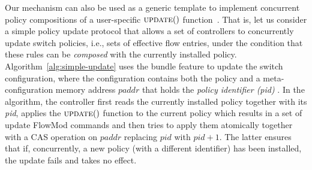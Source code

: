 \documentclass[conference]{sigcomm-alternate}
\newcommand{\paddr}{\textit{paddr}\xspace}
\newcommand{\pid}{\textit{pid}\xspace}
\newcommand{\ufunc}{update} %
\newcommand{\liron}[1]{\textit{\textcolor{mygreen}{[liron]: #1}}} %
\newcommand{\petr}[1]{\textit{\textcolor{blue}{[petr]: #1}}} %
\begin{document}





Our mechanism can also be used as a generic template to
implement concurrent policy compositions of a user-specific
$\textsc{\ufunc}()$ function~\cite{stn}.
That is, let us consider a simple policy update protocol that
allows a set of  controllers to concurrently update switch policies, i.e., sets of
effective flow entries, under the
condition that these rules can be \emph{composed} with the currently installed
policy.
Algorithm~\ref{alg:simple-update} uses the bundle feature to update
the switch configuration, where the configuration contains both the
policy and a meta-configuration memory address $\paddr$ that holds the \emph{policy identifier (pid)} .
In the algorithm, the controller first reads the currently installed
policy together with its {\pid},  applies the
$\textsc{\ufunc}()$ function to the current policy which results in a
set of update FlowMod commands and then tries to apply them
atomically together with a CAS operation on $\paddr$ replacing $\pid$
with $\pid+1$.
The latter ensures that if, concurrently, a new policy (with a different identifier) has been installed, the update
fails and takes no effect.


\end{document}
